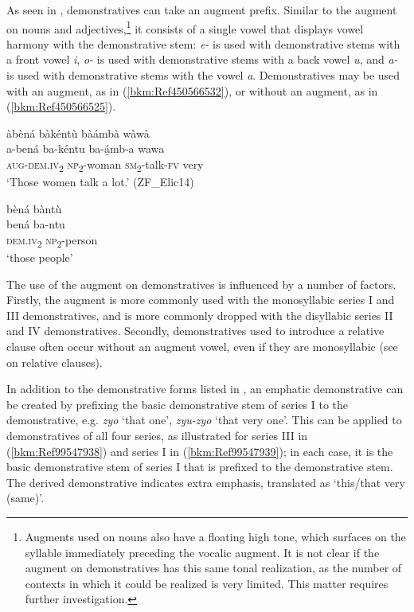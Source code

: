 As seen in , demonstratives can take an augment prefix. Similar to the augment on nouns and adjectives,\footnote{Augments used on nouns also have a floating high tone, which surfaces on the syllable immediately preceding the vocalic augment. It is not clear if the augment on demonstratives has this same tonal realization, as the number of contexts in which it could be realized is very limited. This matter requires further investigation.} it consists of a single vowel that displays vowel harmony with the demonstrative stem: \textit{e-} is used with demonstrative stems with a front vowel \textit{i}, \textit{o-} is used with demonstrative stems with a back vowel \textit{u}, and \textit{a-} is used with demonstrative stems with the vowel \textit{a}. Demonstratives may be used with an augment, as in (\ref{bkm:Ref450566532}), or without an augment, as in (\ref{bkm:Ref450566525}).

\ea
\label{bkm:Ref450566532}
àbèná bàkéntù bàámbà wàwà\\
\gll a-bená  ba-kéntu  ba-á̲mb-a  wawa\\
\textsc{aug}-\textsc{dem}.\textsc{iv}\textsubscript{2}  \textsc{np}\textsubscript{2}-woman  \textsc{sm}\textsubscript{2}-talk-\textsc{fv}  very\\
\glt ‘Those women talk a lot.’ (ZF\_Elic14)
\z

\ea
\label{bkm:Ref450566525}
bèná bàntù\\
\gll bená    ba-ntu\\
\textsc{dem}.\textsc{iv}\textsubscript{2}  \textsc{np}\textsubscript{2}-person\\
\glt ‘those people’
\z

The use of the augment on demonstratives is influenced by a number of factors. Firstly, the augment is more commonly used with the monosyllabic series I and III demonstratives, and is more commonly dropped with the disyllabic series II and IV demonstratives. Secondly, demonstratives used to introduce a relative clause often occur without an augment vowel, even if they are monosyllabic (see  on relative clauses).

In addition to the demonstrative forms listed in , an emphatic demonstrative can be created by prefixing the basic demonstrative stem of series I to the demonstrative, e.g. \textit{zyo} ‘that one’, \textit{zyu-zyo} ‘that very one’. This can be applied to demonstratives of all four series, as illustrated for series III in (\ref{bkm:Ref99547938}) and series I in (\ref{bkm:Ref99547939}); in each case, it is the basic demonstrative stem of series I that is prefixed to the demonstrative stem. The derived demonstrative indicates extra emphasis, translated as ‘this/that very (same)’.

